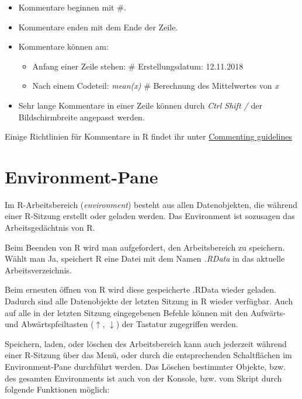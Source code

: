 \documentclass[]{article}
\providecommand{\tightlist}{%
  \setlength{\itemsep}{0pt}\setlength{\parskip}{0pt}}
\begin{document}
\begin{itemize}
\tightlist
\item
  Kommentare beginnen mit \(\#\).
\item
  Kommentare enden mit dem Ende der Zeile.
\item
  Kommentare können am:

  \begin{itemize}
  \tightlist
  \item
    Anfang einer Zeile stehen: \(\#\) Erstellungsdatum: 12.11.2018
  \item
    Nach einem Codeteil: \emph{mean(x)} \(\#\) Berechnung des
    Mittelwertes von \emph{x}
  \end{itemize}
\item
  Sehr lange Kommentare in einer Zeile können durch
  \textit{Ctrl Shift /} der Bildschirmbreite angepasst werden.
\end{itemize}

Einige Richtlinien für Kommentare in R findet ihr unter
\href{https://google.github.io/styleguide/Rguide.xml\#comments}{Commenting
guidelines}

\section{Environment-Pane}\label{environment-pane}

Im R-Arbeitsbereich (\emph{environment}) besteht aus allen
Datenobjekten, die während einer R-Sitzung erstellt oder geladen werden.
Das Environment ist sozusagen das Arbeitsgedächtnis von R.

Beim Beenden von R wird man aufgefordert, den Arbeitsbereich zu
speichern. Wählt man Ja, speichert R eine Datei mit dem Namen
\emph{.RData} in das aktuelle Arbeitsverzeichnis.

Beim erneuten öffnen von R wird diese gespeicherte .RData wieder
geladen. Dadurch sind alle Datenobjekte der letzten Sitzung in R wieder
verfügbar. Auch auf alle in der letzten Sitzung eingegebenen Befehle
können mit den Aufwärts- und Abwärtspfeiltasten (\(\uparrow\),
\(\downarrow\)) der Tastatur zugegriffen werden.

Speichern, laden, oder löschen des Arbeitsbereich kann auch jederzeit
während einer R-Sitzung über das Menü, oder durch die entsprechenden
Schaltflächen im Environment-Pane durchführt werden. Das Löschen
bestimmter Objekte, bzw. des gesamten Environments ist auch von der
Konsole, bzw. vom Skript durch folgende Funktionen möglich:
\end{document}
